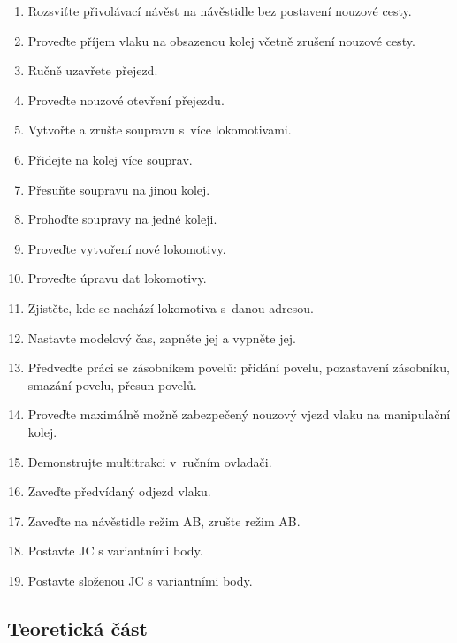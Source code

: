 \documentclass[12pt,a4paper]{article}
\begin{document}
\begin{enumerate}[leftmargin=*]
\item Rozsviťte přivolávací návěst na návěstidle bez postavení nouzové cesty.
\item Proveďte příjem vlaku na obsazenou kolej včetně zrušení nouzové cesty.
\item Ručně uzavřete přejezd.
\item Proveďte nouzové otevření přejezdu.
\item Vytvořte a zrušte soupravu s~více lokomotivami.
\item Přidejte na kolej více souprav.
\item Přesuňte soupravu na jinou kolej.
\item Prohoďte soupravy na jedné koleji.
\item Proveďte vytvoření nové lokomotivy.
\item Proveďte úpravu dat lokomotivy.
\item Zjistěte, kde se nachází lokomotiva s~danou adresou.
\item Nastavte modelový čas, zapněte jej a vypněte jej.
\item Předveďte práci se zásobníkem povelů: přidání povelu, pozastavení
zásobníku, smazání povelu, přesun povelů.
\item Proveďte maximálně možně zabezpečený nouzový vjezd vlaku na manipulační
kolej.
\item Demonstrujte multitrakci v~ručním ovladači.
\item Zaveďte předvídaný odjezd vlaku.
\item Zaveďte na návěstidle režim AB, zrušte režim AB.
\item Postavte JC s variantními body.
\item Postavte složenou JC s variantními body.
\end{enumerate}

\newpage
\subsection{Teoretická část}
\end{document}
